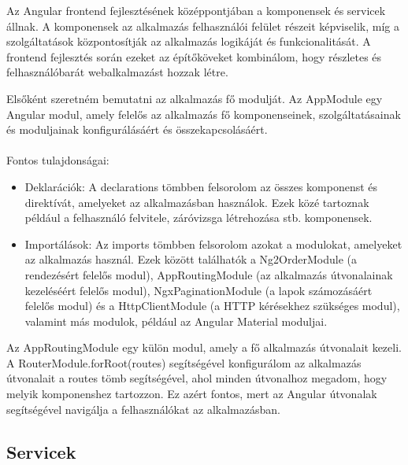
Az Angular\cite{angular} frontend fejlesztésének középpontjában a komponensek és servicek állnak. A komponensek az alkalmazás felhasználói felület részeit képviselik, míg a szolgáltatások központosítják az alkalmazás logikáját és funkcionalitását. A frontend fejlesztés során ezeket az építőköveket kombinálom, hogy részletes és felhasználóbarát webalkalmazást hozzak létre.

Elsőként szeretném bemutatni az alkalmazás fő modulját. Az AppModule egy Angular\cite{angular} modul, amely felelős az alkalmazás fő komponenseinek, szolgáltatásainak és moduljainak konfigurálásáért és összekapcsolásáért. \\
\\Fontos tulajdonságai:

\begin{itemize}

\item{Deklarációk:} A declarations tömbben felsorolom az összes komponenst és direktívát, amelyeket az alkalmazásban használok. Ezek közé tartoznak például a felhasználó felvitele, záróvizsga létrehozása stb. komponensek. 

\item{Importálások:} Az imports tömbben felsorolom azokat a modulokat, amelyeket az alkalmazás használ. Ezek között találhatók a Ng2OrderModule (a rendezésért felelős modul), AppRoutingModule (az alkalmazás útvonalainak kezeléséért felelős modul), NgxPaginationModule (a lapok számozásáért felelős modul) és a HttpClientModule (a HTTP\cite{http} kérésekhez szükséges modul), valamint más modulok, például az Angular Material moduljai.

\end{itemize}

Az AppRoutingModule egy külön modul, amely a fő alkalmazás útvonalait kezeli. A RouterModule.forRoot(routes) segítségével konfigurálom az alkalmazás útvonalait a routes tömb segítségével, ahol minden útvonalhoz megadom, hogy melyik komponenshez tartozzon. Ez azért fontos, mert az Angular\cite{angular} útvonalak segítségével navigálja a felhasználókat az alkalmazásban.


\subsection{Servicek}

